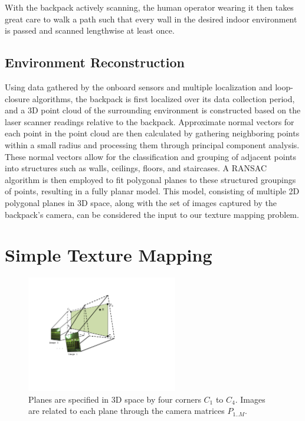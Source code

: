 \documentclass[10pt,twocolumn,letterpaper]{article}
\begin{document}
With the backpack actively scanning, the human operator wearing it
then takes great care to walk a path such that every wall in the
desired indoor environment is passed and scanned lengthwise at least
once.

\subsection{Environment Reconstruction}
Using data gathered by the onboard sensors and multiple localization
and loop-closure algorithms, the backpack is first localized over its data
collection period, and a 3D point cloud of the surrounding environment
is constructed based on the laser scanner readings relative to the backpack. Approximate normal
vectors for each point in the point cloud are then calculated by
gathering neighboring points within a small radius and processing them
through principal component analysis. These normal vectors allow for
the classification and grouping of adjacent points into structures
such as walls, ceilings, floors, and staircases. A RANSAC algorithm is
then employed to fit polygonal planes to these structured groupings of
points, resulting in a fully planar model. This model,
consisting of multiple 2D polygonal planes in 3D space, along with the
set of images captured by the backpack's camera, can be considered the
input to our texture mapping problem.


\section{Simple Texture Mapping}

\begin{figure}
  \centering
  \includegraphics[height=2in]{Projection.pdf}
  \caption{Planes are specified in 3D space by four corners $C_1$ to
    $C_4$. Images are related to each plane through the camera
    matrices $P_{1..M}$. }
  \label{fig:projection}
\end{figure}
\end{document}
